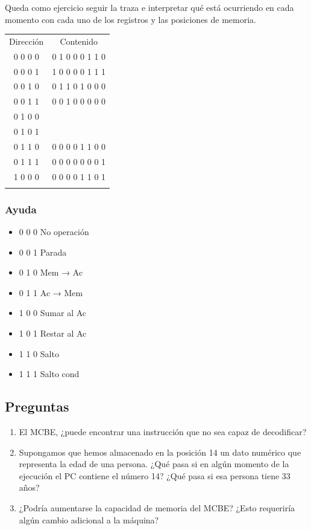 \documentclass[spanish,A4,]{article}
\begin{document}
Queda como ejercicio seguir la traza e interpretar qué está ocurriendo
en cada momento con cada uno de los registros y las posiciones de
memoria.

\begin{longtable}[c]{@{}cc@{}}
\toprule\addlinespace
Dirección & Contenido
\\\addlinespace
\midrule\endhead
0 0 0 0 0 & 0 1 0 0 0 1 1 0
\\\addlinespace
0 0 0 0 1 & 1 0 0 0 0 1 1 1
\\\addlinespace
0 0 0 1 0 & 0 1 1 0 1 0 0 0
\\\addlinespace
0 0 0 1 1 & 0 0 1 0 0 0 0 0
\\\addlinespace
0 0 1 0 0 &
\\\addlinespace
0 0 1 0 1 &
\\\addlinespace
0 0 1 1 0 & 0 0 0 0 1 1 0 0
\\\addlinespace
0 0 1 1 1 & 0 0 0 0 0 0 0 1
\\\addlinespace
0 1 0 0 0 & 0 0 0 0 1 1 0 1
\\\addlinespace
\bottomrule
\end{longtable}

\subsubsection{Ayuda}\label{ayuda}

\begin{itemize}
\itemsep1pt\parskip0pt
\item
  0 0 0 No operación
\item
  0 0 1 Parada
\item
  0 1 0 Mem → Ac
\item
  0 1 1 Ac → Mem
\item
  1 0 0 Sumar al Ac
\item
  1 0 1 Restar al Ac
\item
  1 1 0 Salto
\item
  1 1 1 Salto cond
\end{itemize}

\subsection{Preguntas}\label{preguntas}

\begin{enumerate}
\def\labelenumi{\arabic{enumi}.}
\itemsep1pt\parskip0pt
\item
  El MCBE, ¿puede encontrar una instrucción que no sea capaz de
  decodificar?
\item
  Supongamos que hemos almacenado en la posición 14 un dato numérico que
  representa la edad de una persona. ¿Qué pasa si en algún momento de la
  ejecución el PC contiene el número 14? ¿Qué pasa si esa persona tiene
  33 años?
\item
  ¿Podría aumentarse la capacidad de memoria del MCBE? ¿Esto requeriría
  algún cambio adicional a la máquina?
\end{enumerate}
\end{document}
